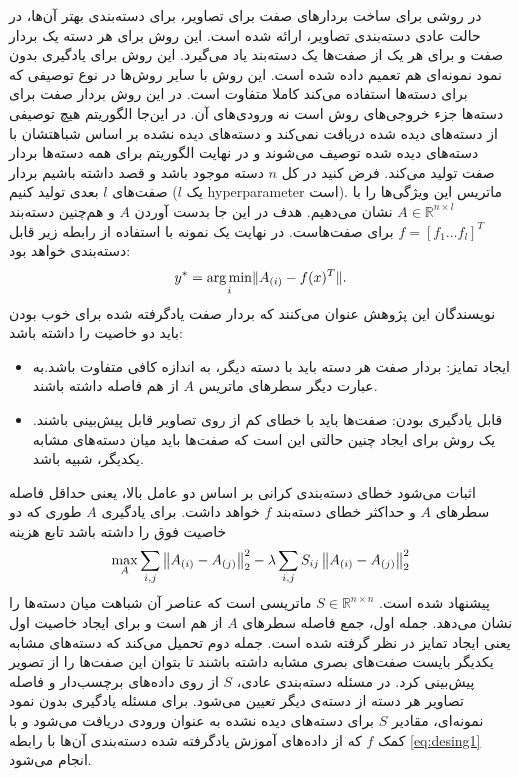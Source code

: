  
 در \cite{Yu2013} روشی برای ساخت بردارهای صفت برای تصاویر، برای دسته‌بندی بهتر آن‌ها، در حالت عادی دسته‌بندی تصاویر، ارائه شده است. این روش برای هر دسته یک بردار صفت و برای هر یک از صفت‌ها یک دسته‌بند یاد می‌گیرد. 
  این روش برای یادگیری بدون نمود نمونه‌ای هم تعمیم داده شده است. این روش با سایر روش‌ها در نوع توصیفی که برای دسته‌ها استفاده می‌کند کاملا متفاوت است. در این روش بردار صفت برای دسته‌ها جزء خروجی‌های روش است نه ورودی‌های آن. در این‌جا الگوریتم هیچ توصیفی از دسته‌های دیده شده دریافت نمی‌کند و دسته‌های دیده نشده بر اساس شباهتشان با دسته‌های دیده شده توصیف می‌شوند و در نهایت الگوریتم برای همه دسته‌ها بردار صفت تولید می‌کند. فرض کنید در کل $n$ دسته موجود باشد و قصد داشته باشیم بردار صفت‌های $l$ بعدی تولید کنیم ($l$ یک \gls{hyperparameter} است). ماتریس این ويژگی‌ها را با 
  $ A \in \mathbb{R}^{n \times l}$
  نشان می‌دهیم. هدف در این جا بدست آوردن $A$ و هم‌چنین دسته‌بند
$f = [f_1 \ldots f_l]^T$
   برای صفت‌هاست. در نهایت یک نمونه با استفاده از رابطه زیر قابل دسته‌بندی خواهد بود:
 \begin{equation}
 \label{eq:desing1}
 y^* = \operatorname*{arg\,min}_i \lVert A_{(i)} - f(x)^T \rVert.
 \end{equation}
 نویسندگان این پژوهش عنوان می‌کنند که بردار صفت یادگرفته شده برای خوب بودن باید دو خاصیت را داشته باشد:
 \begin{itemize}
 \item 
 ایجاد تمایز: بردار صفت هر دسته باید با دسته دیگر، به اندازه کافی متفاوت باشد.به عبارت دیگر سطرهای ماتریس $A$ از هم فاصله داشته باشند.
 \item
 قابل یادگیری بودن: صفت‌ها باید با خطای کم از روی تصاویر قابل پیش‌بینی باشند. یک روش برای ایجاد چنین حالتی این است که صفت‌ها باید میان دسته‌های مشابه یکدیگر، شبیه باشد.
 \end{itemize}
اثبات می‌شود خطای دسته‌بندی کرانی بر اساس دو عامل بالا، یعنی حداقل فاصله سطرهای $A$ و حداکثر خطای دسته‌بند $f$ خواهد داشت. 
برای یادگیری $A$ طوری که دو خاصیت فوق را داشته باشد تابع هزینه 
\begin{equation}
\label{eq:design2}
\max_A \sum_{i,j} \left \lVert A_{(i)} - A_{(j)} \right \rVert_2^2 - \lambda \sum_{i,j} S_{ij} \left \lVert A_{(i)} - A_{(j)} \right \rVert_2^2
\end{equation}
پیشنهاد شده است.
$ S \in \mathbb{R}^{n \times n}$
 ماتریسی است که عناصر آن شباهت میان دسته‌ها را نشان می‌دهد. جمله اول، جمع فاصله سطرهای $A$ از هم است و  برای ایجاد خاصیت اول یعنی ایجاد تمایز در نظر گرفته شده است. جمله دوم تحمیل می‌کند که دسته‌های مشابه یکدیگر بایست صفت‌های بصری مشابه داشته باشند تا بتوان این صفت‌ها را از تصویر پیش‌بینی کرد. 
 در مسئله دسته‌بندی عادی، $S$ از روی داده‌های برچسب‌دار و  فاصله تصاویر هر دسته از دسته‌ی دیگر تعیین می‌شود. برای مسئله یادگیری بدون نمود نمونه‌ای، مقادیر $S$ برای دسته‌های دیده نشده به عنوان ورودی دریافت می‌شود و با کمک $f$ که از داده‌های آموزش یادگرفته شده دسته‌بندی آن‌ها با رابطه 
 \eqref{eq:desing1}
  انجام می‌شود.


